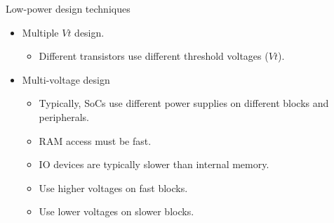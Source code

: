 \documentclass[]{slides}
\begin{document}
\begin{frame}{Low-power design techniques}{}
\begin{itemize}
\item Multiple $Vt$ design.
\begin{itemize}
  \item Different transistors use different threshold voltages ($Vt$).
\end{itemize}
\item Multi-voltage design
\begin{itemize}
  \item Typically, \acp{SoC} use different power supplies on different blocks and peripherals.
  \item \ac{RAM} access must be fast.
  \item \ac{IO} devices are typically slower than internal memory.
  \item Use higher voltages on fast blocks.
  \item Use lower voltages on slower blocks.
\end{itemize}
\end{itemize}
\end{frame}
\end{document}
